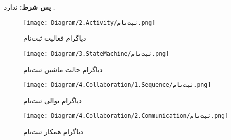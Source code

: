 \noindent
\textbf{پس شرط:}
ندارد .


\begin{figure}[H]
	\centering
	\texttt{[image: Diagram/2.Activity/ثبت‌نام.png]}
	\caption{دیاگرام فعالیت ثبت‌نام}
	\label{fig:a:ثبت‌نام}
\end{figure}
\begin{figure}[H]
\centering
\texttt{[image: Diagram/3.StateMachine/ثبت‌نام.png]}
\caption{دیاگرام حالت ماشین ثبت‌نام}
\label{fig:sm:ثبت‌نام}
\end{figure}
\begin{figure}[H]
	\centering
	\texttt{[image: Diagram/4.Collaboration/1.Sequence/ثبت‌نام.png]}
	\caption{دیاگرام توالی ثبت‌نام}
	\label{fig:s:ثبت‌نام}
\end{figure}
\begin{figure}[H]
\centering
\texttt{[image: Diagram/4.Collaboration/2.Communication/ثبت‌نام.png]}
\caption{دیاگرام همکار ثبت‌نام}
\label{fig:c:ثبت‌نام}
\end{figure}
